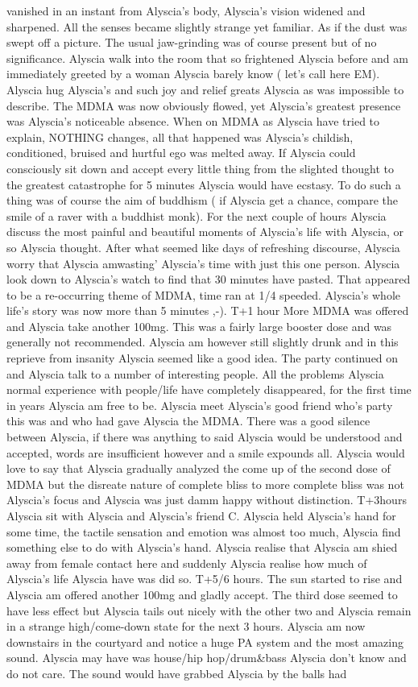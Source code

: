 \documentclass[12pt]{book}
\begin{document}
vanished in an instant from Alyscia's body, Alyscia's vision widened and sharpened. All the senses became slightly strange yet familiar. As if the dust was swept off a picture. The usual jaw-grinding was of course present but of no significance. Alyscia walk into the room that so frightened Alyscia before and am immediately greeted by a woman Alyscia barely know ( let's call here EM). Alyscia hug Alyscia's and such joy and relief greats Alyscia as was impossible to describe. The MDMA was now obviously flowed, yet Alyscia's greatest presence was Alyscia's noticeable absence. When on MDMA as Alyscia have tried to explain, NOTHING changes, all that happened was Alyscia's childish, conditioned, bruised and hurtful ego was melted away. If Alyscia could consciously sit down and accept every little thing from the slighted thought to the greatest catastrophe for 5 minutes Alyscia would have ecstasy. To do such a thing was of course the aim of buddhism ( if Alyscia get a chance, compare the smile of a raver with a buddhist monk). For the next couple of hours Alyscia discuss the most painful and beautiful moments of Alyscia's life with Alyscia, or so Alyscia thought. After what seemed like days of refreshing discourse, Alyscia worry that Alyscia amwasting' Alyscia's time with just this one person. Alyscia look down to Alyscia's watch to find that 30 minutes have pasted. That appeared to be a re-occurring theme of MDMA, time ran at 1/4 speeded. Alyscia's whole life's story was now more than 5 minutes ,-). T+1 hour More MDMA was offered and Alyscia take another 100mg. This was a fairly large booster dose and was generally not recommended. Alyscia am however still slightly drunk and in this reprieve from insanity Alyscia seemed like a good idea. The party continued on and Alyscia talk to a number of interesting people. All the problems Alyscia normal experience with people/life have completely disappeared, for the first time in years Alyscia am free to be. Alyscia meet Alyscia's good friend who's party this was and who had gave Alyscia the MDMA. There was a good silence between Alyscia, if there was anything to said Alyscia would be understood and accepted, words are insufficient however and a smile expounds all. Alyscia would love to say that Alyscia gradually analyzed the come up of the second dose of MDMA but the disreate nature of complete bliss to more complete bliss was not Alyscia's focus and Alyscia was just damm happy without distinction. T+3hours Alyscia sit with Alyscia and Alyscia's friend C. Alyscia held Alyscia's hand for some time, the tactile sensation and emotion was almost too much, Alyscia find something else to do with Alyscia's hand. Alyscia realise that Alyscia am shied away from female contact here and suddenly Alyscia realise how much of Alyscia's life Alyscia have was did so. T+5/6 hours. The sun started to rise and Alyscia am offered another 100mg and gladly accept. The third dose seemed to have less effect but Alyscia tails out nicely with the other two and Alyscia remain in a strange high/come-down state for the next 3 hours. Alyscia am now downstairs in the courtyard and notice a huge PA system and the most amazing sound. Alyscia may have was house/hip hop/drum\&bass Alyscia don't know and do not care. The sound would have grabbed Alyscia by the balls had 
\end{document}
